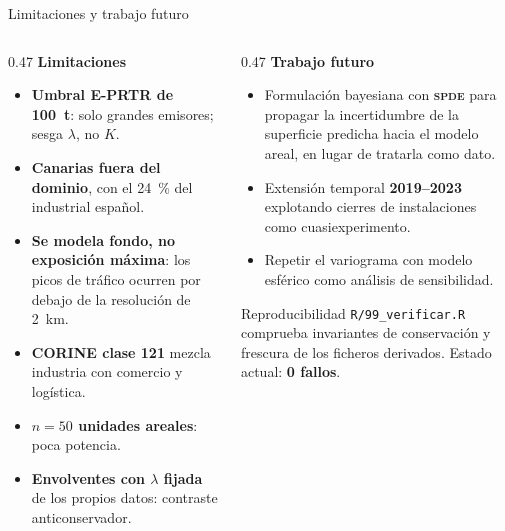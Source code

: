 \documentclass[11pt,aspectratio=169]{beamer}
\begin{document}
\begin{frame}{Limitaciones y trabajo futuro}

\begin{columns}[T]
\begin{column}{0.47\textwidth}
\textbf{Limitaciones}
\begin{itemize}\footnotesize
  \item \textbf{Umbral E-PRTR de \SI{100}{\tonne}}: solo grandes emisores;
  sesga $\lambda$, no $K$.
  \item \textbf{Canarias fuera del dominio}, con el \SI{24}{\percent} del
   industrial español.
  \item \textbf{Se modela fondo, no exposición máxima}: los picos de tráfico
  ocurren por debajo de la resolución de \SI{2}{\kilo\metre}.
  \item \textbf{CORINE clase 121} mezcla industria con comercio y logística.
  \item \textbf{$n = \num{50}$ unidades areales}: poca potencia.
  \item \textbf{Envolventes con $\lambda$ fijada} de los propios datos:
  contraste anticonservador.
\end{itemize}
\end{column}

\begin{column}{0.47\textwidth}
\textbf{Trabajo futuro}
\begin{itemize}\footnotesize
  \item Formulación bayesiana con \textbf{\textsc{spde}} para propagar la
  incertidumbre de la superficie predicha hacia el modelo areal, en lugar de
  tratarla como dato.
  \item Extensión temporal \textbf{2019--2023} explotando cierres de
  instalaciones como cuasiexperimento.
  \item Repetir el variograma con modelo esférico como análisis de
  sensibilidad.
\end{itemize}

\vspace{3mm}
\begin{block}{Reproducibilidad}
\footnotesize
\texttt{R/99\_verificar.R} comprueba invariantes de conservación y frescura de
los ficheros derivados. Estado actual: \textbf{0 fallos}.
\end{block}
\end{column}
\end{columns}

\end{frame}
\end{document}
